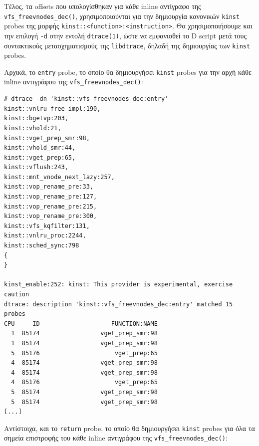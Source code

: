 \documentclass[12pt]{article}
\begin{document}
Τέλος, τα offsets που υπολογίσθηκαν για κάθε inline αντίγραφο της
\lstinline{vfs_freevnodes_dec()}, χρησιμοποιούνται για την δημιουργία κανονικών
\lstinline{kinst} probes της μορφής
\lstinline{kinst::<function>:<instruction>}. Θα χρησιμοποιήσουμε και την
επιλογή \lstinline{-d} στην εντολή \lstinline{dtrace(1)}, ώστε να εμφανισθεί το
D script μετά τους συντακτικούς μετασχηματισμούς της \lstinline{libdtrace},
δηλαδή της δημιουργίας των \lstinline{kinst} probes.

Αρχικά, το \lstinline{entry} probe, το οποίο θα δημιουργήσει \lstinline{kinst}
probes για την αρχή κάθε inline αντιγράφου της
\lstinline{vfs_freevnodes_dec()}:

\begin{lstlisting}
# dtrace -dn 'kinst::vfs_freevnodes_dec:entry'
kinst::vnlru_free_impl:190,
kinst::bgetvp:203,
kinst::vhold:21,
kinst::vget_prep_smr:98,
kinst::vhold_smr:44,
kinst::vget_prep:65,
kinst::vflush:243,
kinst::mnt_vnode_next_lazy:257,
kinst::vop_rename_pre:33,
kinst::vop_rename_pre:127,
kinst::vop_rename_pre:215,
kinst::vop_rename_pre:300,
kinst::vfs_kqfilter:131,
kinst::vnlru_proc:2244,
kinst::sched_sync:798
{
}

kinst_enable:252: kinst: This provider is experimental, exercise caution
dtrace: description 'kinst::vfs_freevnodes_dec:entry' matched 15 probes
CPU     ID                    FUNCTION:NAME
  1  85174                 vget_prep_smr:98
  1  85174                 vget_prep_smr:98
  5  85176                     vget_prep:65
  4  85174                 vget_prep_smr:98
  4  85174                 vget_prep_smr:98
  4  85176                     vget_prep:65
  5  85174                 vget_prep_smr:98
  5  85174                 vget_prep_smr:98
[...]
\end{lstlisting}

Αντίστοιχα, και το \lstinline{return} probe, το οποίο θα δημιουργήσει
\lstinline{kinst} probes για όλα τα σημεία επιστροφής του κάθε inline
αντιγράφου της \lstinline{vfs_freevnodes_dec()}:
\end{document}
